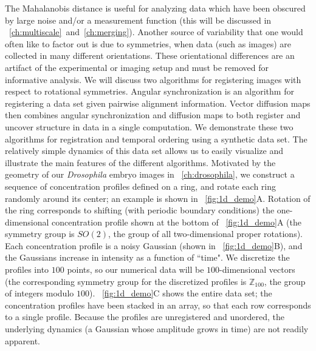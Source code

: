 The Mahalanobis distance is useful for analyzing data which have been obscured by large noise and/or a measurement function (this will be discussed in \chap~\ref{ch:multiscale}~and~\ref{ch:merging}). 
%
Another source of variability that one would often like to factor out is due to symmetries, when data (such as images) are collected in many different orientations. 
%
These orientational differences are an artifact of the experimental or imaging setup and must be removed for informative analysis.
%
We will discuss two algorithms for registering images with respect to rotational symmetries. 
%
Angular synchronization \cite{singer2011angular} is an algorithm for registering a data set given pairwise alignment information. 
%
Vector diffusion maps \cite{singer2012vector} then combines angular synchronization and diffusion maps to both register and uncover structure in data in a single computation. 
%
We demonstrate these two algorithms for registration and temporal ordering using a synthetic data set.
%
The relatively simple dynamics of this data set allows us to easily visualize and illustrate the main features of the different algorithms.
%
Motivated by the geometry of our {\em Drosophila} embryo images in \chap~\ref{ch:drosophila}, we construct a sequence of concentration profiles defined on a ring, and rotate each ring randomly around its center; an example is shown in \fig~\ref{fig:1d_demo}A.
%
Rotation of the ring corresponds to shifting (with periodic boundary conditions) the one-dimensional concentration profile shown at the bottom of \fig~\ref{fig:1d_demo}A (the symmetry group is $SO(2)$, the group of all two-dimensional proper rotations).
%
Each concentration profile is a noisy Gaussian (shown in \fig~\ref{fig:1d_demo}B), and the Gaussians increase in intensity as a function of ``time".
%
We discretize the profiles into $100$ points, so our numerical data will be $100$-dimensional vectors (the corresponding symmetry group for the discretized profiles is $\mathbb{Z}_{100}$, the group of integers modulo $100$).
%
\fig~\ref{fig:1d_demo}C shows the entire data set; the concentration profiles have been stacked in an array, so that each row corresponds to a single profile.
%
Because the profiles are unregistered and unordered, the underlying dynamics (a Gaussian whose amplitude grows in time) are not readily apparent.


